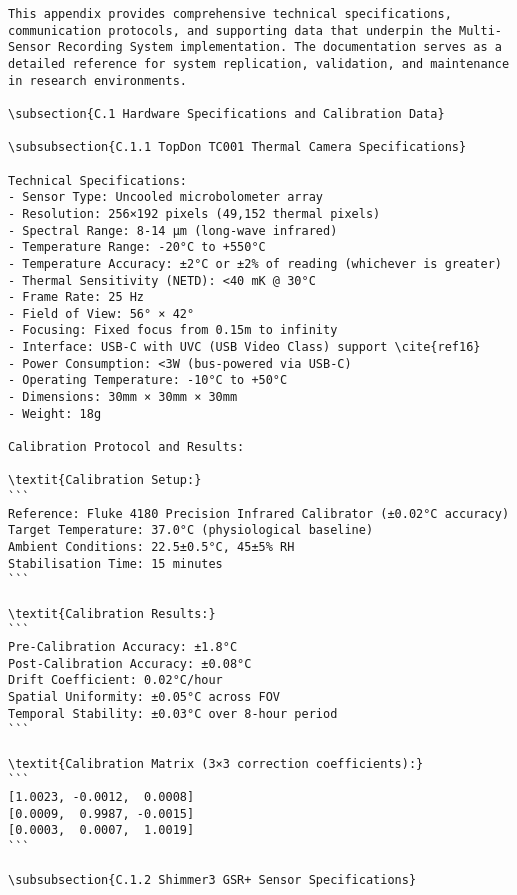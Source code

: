 \begin{verbatim}
This appendix provides comprehensive technical specifications, communication protocols, and supporting data that underpin the Multi-Sensor Recording System implementation. The documentation serves as a detailed reference for system replication, validation, and maintenance in research environments.

\subsection{C.1 Hardware Specifications and Calibration Data}

\subsubsection{C.1.1 TopDon TC001 Thermal Camera Specifications}

Technical Specifications:
- Sensor Type: Uncooled microbolometer array
- Resolution: 256×192 pixels (49,152 thermal pixels)
- Spectral Range: 8-14 μm (long-wave infrared)
- Temperature Range: -20°C to +550°C
- Temperature Accuracy: ±2°C or ±2% of reading (whichever is greater)
- Thermal Sensitivity (NETD): <40 mK @ 30°C
- Frame Rate: 25 Hz
- Field of View: 56° × 42°
- Focusing: Fixed focus from 0.15m to infinity
- Interface: USB-C with UVC (USB Video Class) support \cite{ref16}
- Power Consumption: <3W (bus-powered via USB-C)
- Operating Temperature: -10°C to +50°C
- Dimensions: 30mm × 30mm × 30mm
- Weight: 18g

Calibration Protocol and Results:

\textit{Calibration Setup:}
```
Reference: Fluke 4180 Precision Infrared Calibrator (±0.02°C accuracy)
Target Temperature: 37.0°C (physiological baseline)
Ambient Conditions: 22.5±0.5°C, 45±5% RH
Stabilisation Time: 15 minutes
```

\textit{Calibration Results:}
```
Pre-Calibration Accuracy: ±1.8°C
Post-Calibration Accuracy: ±0.08°C
Drift Coefficient: 0.02°C/hour
Spatial Uniformity: ±0.05°C across FOV
Temporal Stability: ±0.03°C over 8-hour period
```

\textit{Calibration Matrix (3×3 correction coefficients):}
```
[1.0023, -0.0012,  0.0008]
[0.0009,  0.9987, -0.0015]
[0.0003,  0.0007,  1.0019]
```

\subsubsection{C.1.2 Shimmer3 GSR+ Sensor Specifications}


\end{verbatim}
